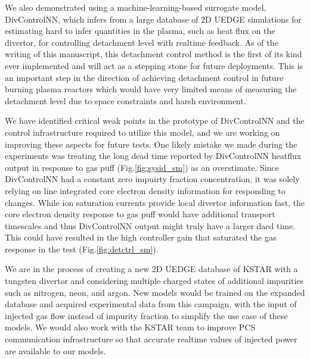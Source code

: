 We also demonstrated using a machine-learning-based surrogate model, DivControlNN, which infers from a large database of 2D UEDGE simulations for estimating hard to infer quantities in the plasma, such as heat flux on the divertor, for controlling detachment level with realtime feedback.
As of the writing of this manuscript, this detachment control method is the first of its kind ever implemented and will act as a stepping stone for future deployments.
This is an important step in the direction of achieving detachment control in future burning plasma reactors which would have very limited means of measuring the detachment level due to space constraints and harsh environment.

We have identified critical weak points in the prototype of DivControlNN and the control infrastructure required to utilize this model, and we are working on improving these aspects for future tests.
One likely mistake we made during the experiments was treating the long dead time reported by DivControlNN heatflux output in response to gas puff (Fig.\ref{fig:sysid_sm}) as an overstimate.
Since DivControlNN had a constant zero impuirty fraction concentration, it was solely relying on line integrated core electron density information for responding to changes.
While ion saturation currents provide local divertor information fast, the core electron density response to gas puff would have additional transport timescales and thus DivControlNN output might truly have a larger daed time.
This could have resulted in the high controller gain that saturated the gas response in the test (Fig.\ref{fig:detctrl_sm}).

We are in the process of creating a new 2D UEDGE database of KSTAR with a tungsten divertor and considering multiple charged states of additional impurities such as nitrogen, neon, and argon.
New models would be trained on the expanded database and acquired experimental data from this campaign, with the input of injected gas flow instead of impurity fraction to simplify the use case of these models.
We would also work with the KSTAR team to improve PCS communication infrastructure so that accurate realtime values of injected power are available to our models.

